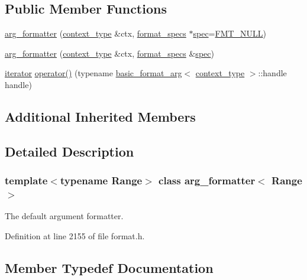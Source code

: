 \subsection*{Public Member Functions}
\begin{DoxyCompactItemize}
\item 
\hyperlink{classarg__formatter_a487efe4918c55106464196727524057a}{arg\+\_\+formatter} (\hyperlink{classbasic__format__context}{context\+\_\+type} \&ctx, \hyperlink{classinternal_1_1arg__formatter__base_acff46f7da1afa536210eb77a2ea0d775}{format\+\_\+specs} $\ast$\hyperlink{classinternal_1_1arg__formatter__base_aee5efc224d29ce5352d856cbb9afeffa}{spec}=\hyperlink{core_8h_af7f827e50dd7667484c279ac1d38f30b}{F\+M\+T\+\_\+\+N\+U\+LL})
\item 
\hyperlink{classarg__formatter_aeaee70db546c421ada9685b16b7a40c8}{arg\+\_\+formatter} (\hyperlink{classbasic__format__context}{context\+\_\+type} \&ctx, \hyperlink{classinternal_1_1arg__formatter__base_acff46f7da1afa536210eb77a2ea0d775}{format\+\_\+specs} \&\hyperlink{classinternal_1_1arg__formatter__base_aee5efc224d29ce5352d856cbb9afeffa}{spec})
\item 
\hyperlink{classarg__formatter_a8bdde3948f23cf63cdcb36b82a927199}{iterator} \hyperlink{classarg__formatter_ac8ddd9b78934fc951916a30d46114ab1}{operator()} (typename \hyperlink{classbasic__format__arg}{basic\+\_\+format\+\_\+arg}$<$ \hyperlink{classbasic__format__context}{context\+\_\+type} $>$\+::handle handle)
\end{DoxyCompactItemize}
\subsection*{Additional Inherited Members}


\subsection{Detailed Description}
\subsubsection*{template$<$typename Range$>$\newline
class arg\+\_\+formatter$<$ Range $>$}

The default argument formatter. 

Definition at line 2155 of file format.\+h.



\subsection{Member Typedef Documentation}
\mbox{\label{classarg__formatter_ab9ab9e2c7da495700a747c998e92f353}} 
